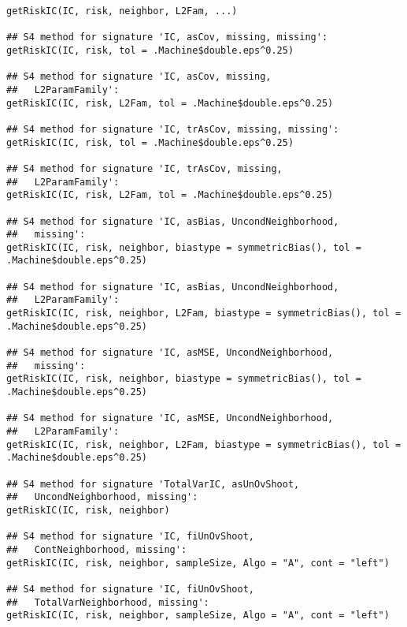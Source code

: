 \begin{Usage}
\begin{verbatim}
getRiskIC(IC, risk, neighbor, L2Fam, ...)

## S4 method for signature 'IC, asCov, missing, missing':
getRiskIC(IC, risk, tol = .Machine$double.eps^0.25)

## S4 method for signature 'IC, asCov, missing,
##   L2ParamFamily':
getRiskIC(IC, risk, L2Fam, tol = .Machine$double.eps^0.25)

## S4 method for signature 'IC, trAsCov, missing, missing':
getRiskIC(IC, risk, tol = .Machine$double.eps^0.25)

## S4 method for signature 'IC, trAsCov, missing,
##   L2ParamFamily':
getRiskIC(IC, risk, L2Fam, tol = .Machine$double.eps^0.25)

## S4 method for signature 'IC, asBias, UncondNeighborhood,
##   missing':
getRiskIC(IC, risk, neighbor, biastype = symmetricBias(), tol = .Machine$double.eps^0.25)

## S4 method for signature 'IC, asBias, UncondNeighborhood,
##   L2ParamFamily':
getRiskIC(IC, risk, neighbor, L2Fam, biastype = symmetricBias(), tol = .Machine$double.eps^0.25)

## S4 method for signature 'IC, asMSE, UncondNeighborhood,
##   missing':
getRiskIC(IC, risk, neighbor, biastype = symmetricBias(), tol = .Machine$double.eps^0.25)

## S4 method for signature 'IC, asMSE, UncondNeighborhood,
##   L2ParamFamily':
getRiskIC(IC, risk, neighbor, L2Fam, biastype = symmetricBias(), tol = .Machine$double.eps^0.25)

## S4 method for signature 'TotalVarIC, asUnOvShoot,
##   UncondNeighborhood, missing':
getRiskIC(IC, risk, neighbor)

## S4 method for signature 'IC, fiUnOvShoot,
##   ContNeighborhood, missing':
getRiskIC(IC, risk, neighbor, sampleSize, Algo = "A", cont = "left")

## S4 method for signature 'IC, fiUnOvShoot,
##   TotalVarNeighborhood, missing':
getRiskIC(IC, risk, neighbor, sampleSize, Algo = "A", cont = "left")
\end{verbatim}
\end{Usage}
